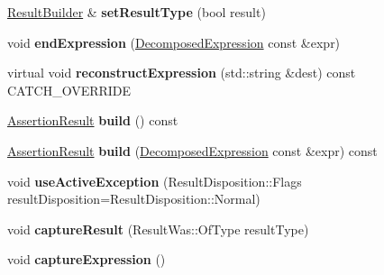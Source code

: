 \begin{DoxyCompactItemize}
\item 
\hyperlink{classCatch_1_1ResultBuilder}{Result\+Builder} \& {\bfseries set\+Result\+Type} (bool result)\hypertarget{classCatch_1_1ResultBuilder_ae504348b073d0360bfd5fc33347ec689}{}\label{classCatch_1_1ResultBuilder_ae504348b073d0360bfd5fc33347ec689}

\item 
void {\bfseries end\+Expression} (\hyperlink{structCatch_1_1DecomposedExpression}{Decomposed\+Expression} const \&expr)\hypertarget{classCatch_1_1ResultBuilder_a864e03b7300271de7cc44b9864463c5a}{}\label{classCatch_1_1ResultBuilder_a864e03b7300271de7cc44b9864463c5a}

\item 
virtual void {\bfseries reconstruct\+Expression} (std\+::string \&dest) const C\+A\+T\+C\+H\+\_\+\+O\+V\+E\+R\+R\+I\+DE\hypertarget{classCatch_1_1ResultBuilder_a7d94b15cf04301a8617e7b16158b5d82}{}\label{classCatch_1_1ResultBuilder_a7d94b15cf04301a8617e7b16158b5d82}

\item 
\hyperlink{classCatch_1_1AssertionResult}{Assertion\+Result} {\bfseries build} () const \hypertarget{classCatch_1_1ResultBuilder_a31eba48feb02817d2151e31bd8331eeb}{}\label{classCatch_1_1ResultBuilder_a31eba48feb02817d2151e31bd8331eeb}

\item 
\hyperlink{classCatch_1_1AssertionResult}{Assertion\+Result} {\bfseries build} (\hyperlink{structCatch_1_1DecomposedExpression}{Decomposed\+Expression} const \&expr) const \hypertarget{classCatch_1_1ResultBuilder_a606377d75e78899c90f94816ae8aff61}{}\label{classCatch_1_1ResultBuilder_a606377d75e78899c90f94816ae8aff61}

\item 
void {\bfseries use\+Active\+Exception} (Result\+Disposition\+::\+Flags result\+Disposition=Result\+Disposition\+::\+Normal)\hypertarget{classCatch_1_1ResultBuilder_a5bbd2f14a678f3e8d0f791ac6d233d65}{}\label{classCatch_1_1ResultBuilder_a5bbd2f14a678f3e8d0f791ac6d233d65}

\item 
void {\bfseries capture\+Result} (Result\+Was\+::\+Of\+Type result\+Type)\hypertarget{classCatch_1_1ResultBuilder_a10e467f7b7a4976e5d148b4d5066e8fd}{}\label{classCatch_1_1ResultBuilder_a10e467f7b7a4976e5d148b4d5066e8fd}

\item 
void {\bfseries capture\+Expression} ()\hypertarget{classCatch_1_1ResultBuilder_af2ae2343965802eeeb0abbd4ea9d2d36}{}\label{classCatch_1_1ResultBuilder_af2ae2343965802eeeb0abbd4ea9d2d36}


\end{DoxyCompactItemize}
